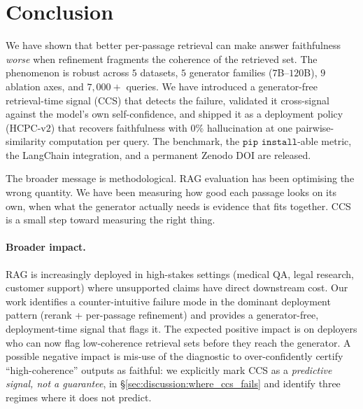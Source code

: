 \section{Conclusion}
\label{sec:conclusion}

We have shown that better per-passage retrieval can make answer
faithfulness \emph{worse} when refinement fragments the coherence of
the retrieved set. The phenomenon is robust across $5$ datasets, $5$
generator families ($7$B--$120$B), $9$ ablation axes, and $7{,}000+$
queries. We have introduced a generator-free retrieval-time signal
(CCS) that detects the failure, validated it cross-signal against the
model's own self-confidence, and shipped it as a deployment policy
(HCPC-v$2$) that recovers faithfulness with $0\%$ hallucination at one
pairwise-similarity computation per query. The benchmark, the
$\texttt{pip install}$-able metric, the LangChain integration, and a
permanent Zenodo DOI are released.

The broader message is methodological. RAG evaluation has been
optimising the wrong quantity. We have been measuring how good each
passage looks on its own, when what the generator actually needs is
evidence that fits together. CCS is a small step toward measuring the
right thing.

\paragraph{Broader impact.}
RAG is increasingly deployed in high-stakes settings (medical QA,
legal research, customer support) where unsupported claims have
direct downstream cost. Our work identifies a counter-intuitive
failure mode in the dominant deployment pattern (rerank +
per-passage refinement) and provides a generator-free,
deployment-time signal that flags it. The expected positive impact
is on deployers who can now flag low-coherence retrieval sets before
they reach the generator. A possible negative impact is mis-use of
the diagnostic to over-confidently certify ``high-coherence'' outputs
as faithful: we explicitly mark CCS as a \emph{predictive signal,
not a guarantee}, in \S\ref{sec:discussion:where_ccs_fails} and
identify three regimes where it does not predict.
